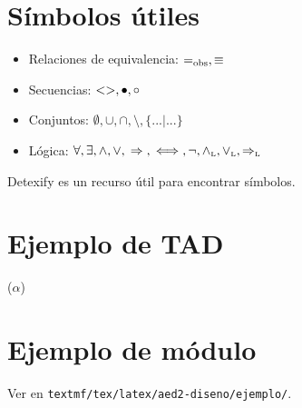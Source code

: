 \documentclass{article}
\begin{document}
\maketitle

\section{Símbolos útiles }

\begin{itemize}
\item Relaciones de equivalencia: $=_{\mathrm{obs}}, \equiv$
\item Secuencias: $<>, \bullet, \circ$
\item Conjuntos: $\emptyset, \cup, \cap, \setminus, \{...|...\}$
\item Lógica: $\forall, \exists, \land, \lor, \implies, \iff, \neg, \yluego, \oluego, \impluego$
\end{itemize}

Detexify es un recurso útil para encontrar símbolos.

\section{Ejemplo de TAD}

\begin{tad}{($\alpha$)}
\tadParametrosFormales{$\alpha$}



\tadGeneradores
{}

\tadObservadores
{}



\medskip

\medskip


\end{tad}

\section{Ejemplo de módulo}

Ver en \texttt{textmf/tex/latex/aed2-diseno/ejemplo/}.
\end{document}
